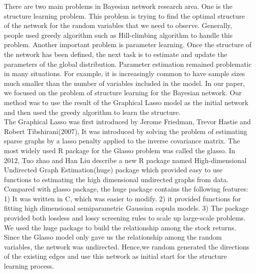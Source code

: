 \documentclass[12pt]{article}
\theoremstyle{plain}
\begin{document}
There are two main problems in Bayesian network research area. One is the structure learning problem. This problem is trying to find the optimal structure of the network for the random variables that we need to observe. Generally, people used greedy algorithm such as Hill-climbing algorithm to handle this problem. Another important problem is parameter learning. Once the structure of the network has been defined, the next task is to estimate and update the parameters of the global distribution.  Parameter estimation remained problematic in many situations. For example, it is increasingly common to have sample sizes much smaller than the number of variables included in the model. In our paper, we focused on the problem of structure learning for the Bayesian network. Our method was to use the result of the Graphical Lasso model as the initial network and then used the greedy algorithm to learn the structure. \\

The Graphical Lasso was first introduced by Jerome Friedman, Trevor Hastie and Robert Tibshirani(2007), It was introduced by solving the problem of estimating sparse graphs by a lasso penalty applied to the inverse covariance matrix. The most widely used R package for the Glasso problem was called the glasso. In 2012, Tuo zhao and Han Liu describe a new R package named High-dimensional Undirected Graph Estimation(huge) package which provided easy to use functions to estimating the high dimensional undirected graphs from data.  Compared with glasso package, the huge package contains the following features: 1) It was written in C, which was easier to modify. 2) it provided functions for fitting high dimensional semiparametric Gaussian copula models. 3) The package provided both lossless and lossy screening rules to scale up large-scale problems. We used the huge package to build the relationship among the stock returns. Since the Glasso model only gave us the relationship among the random variables, the network was undirected. Hence,we random generated the directions of the existing edges and use this network as initial start for the structure learning process. \\
\end{document}
